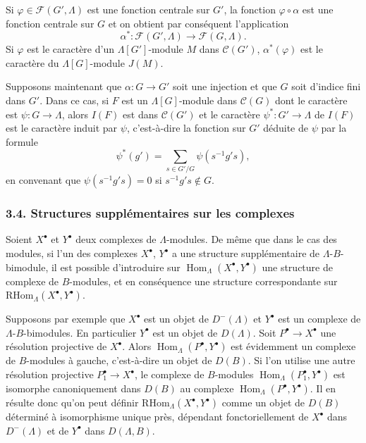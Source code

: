 \documentclass[11pt]{article}
\DeclareMathOperator{\Hom}{Hom}
\providecommand{\RHom}{\mathrm{RHom}}
\providecommand{\RHom}{\mathrm{RHom}}
\providecommand{\Hom}{\operatorname{Hom}}
\providecommand{\RHom}{\mathrm R\mathcal{H}om}
\providecommand{\RHom}{\mathrm{RHom}}
\begin{document}
Si $\varphi\in\mathcal F(G',\Lambda)$ est une fonction centrale sur $G'$, la fonction $\varphi\circ\alpha$ est une fonction centrale sur $G$ et on obtient par conséquent l'application
\[
\alpha^*: \mathcal F(G',\Lambda)\longrightarrow\mathcal F(G,\Lambda).
\]
Si $\varphi$ est le caractère d'un $\Lambda[G']$-module $M$ dans $\mathcal C(G')$, $\alpha^*(\varphi)$ est le caractère du $\Lambda[G]$-module $J(M)$.

Supposons maintenant que $\alpha:G\to G'$ soit une injection et que $G$ soit d'indice fini dans $G'$. Dans ce cas, si $F$ est un $\Lambda[G]$-module dans $\mathcal C(G)$ dont le caractère est $\psi:G\to\Lambda$, alors $I(F)$ est dans $\mathcal C(G')$ et le caractère $\psi^*:G'\to\Lambda$ de $I(F)$ est le caractère induit par $\psi$, c'est-à-dire la fonction sur $G'$ déduite de $\psi$ par la formule
\[
\psi^*(g')=\sum_{s\in G'/G}\psi(s^{-1}g's),
\tag{3.3.1}
\]
en convenant que $\psi(s^{-1}g's)=0$ si $s^{-1}g's\notin G$.

\subsubsection*{3.4. Structures supplémentaires sur les complexes}

Soient $X^\bullet$ et $Y^\bullet$ deux complexes de $\Lambda$-modules. De même que dans le cas des modules, si l'un des complexes $X^\bullet$, $Y^\bullet$ a une structure supplémentaire de $\Lambda$-$B$-bimodule, il est possible d'introduire sur $\Hom_{\Lambda}(X^\bullet,Y^\bullet)$ une structure de complexe de $B$-modules, et en conséquence une structure correspondante sur $\RHom_{\Lambda}(X^\bullet,Y^\bullet)$.

Supposons par exemple que $X^\bullet$ est un objet de $D^-(\Lambda)$ et $Y^\bullet$ est un complexe de $\Lambda$-$B$-bimodules. En particulier $Y^\bullet$ est un objet de $D(\Lambda)$. Soit $P^\bullet\to X^\bullet$ une résolution projective de $X^\bullet$. Alors $\Hom_{\Lambda}(P^\bullet,Y^\bullet)$ est évidemment un complexe de $B$-modules à gauche, c'est-à-dire un objet de $D(B)$. Si l'on utilise une autre résolution projective $P_1^\bullet\to X^\bullet$, le complexe de $B$-modules $\Hom_{\Lambda}(P_1^\bullet,Y^\bullet)$ est isomorphe canoniquement dans $D(B)$ au complexe $\Hom_{\Lambda}(P^\bullet,Y^\bullet)$. Il en résulte donc qu'on peut définir $\RHom_{\Lambda}(X^\bullet,Y^\bullet)$ comme un objet de $D(B)$ déterminé à isomorphisme unique près, dépendant fonctoriellement de $X^\bullet$ dans $D^-(\Lambda)$ et de $Y^\bullet$ dans $D(\Lambda,B)$.
\end{document}
